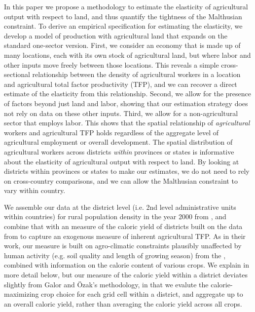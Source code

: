 \documentclass[11pt]{article}
\begin{document}
In this paper we propose a methodology to estimate the elasticity of agricultural output with respect to land, and thus quantify the tightness of the Malthusian constraint. To derive an empirical specification for estimating the elasticity, we develop a model of production with agricultural land that expands on the standard one-sector version. First, we consider an economy that is made up of many locations, each with its own stock of agricultural land, but where labor and other inputs move freely between those locations. This reveals a simple cross-sectional relationship between the density of agricultural workers in a location and agricultural total factor productivity (TFP), and we can recover a direct estimate of the elasticity from this relationship. Second, we allow for the presence of factors beyond just land and labor, showing that our estimation strategy does not rely on data on these other inputs. Third, we allow for a non-agricultural sector that employs labor. This shows that the spatial relationship of \textit{agricultural} workers and agricultural TFP holds regardless of the aggregate level of agricultural employment or overall development. The spatial distribution of agricultural workers across districts \textit{within} provinces or states is informative about the elasticity of agricultural output with respect to land. By looking at districts within provinces or states to make our estimates, we do not need to rely on cross-country comparisons, and we can allow the Malthusian constraint to vary within country.

We assemble our data at the district level (i.e. 2nd level administrative units within countries) for rural population density in the year 2000 from \citet{hyde31}, and combine that with an measure of the caloric yield of districts built on the data from \citet{galorozak2016} to capture an exogenous measure of inherent agricultural TFP. As in their work, our measure is built on agro-climatic constraints plausibly unaffected by human activity (e.g. soil quality and length of growing season) from the \citet{gaez}, combined with information on the calorie content of various crops. We explain in more detail below, but our measure of the caloric yield within a district deviates slightly from Galor and {\"O}zak's methodology, in that we evalute the calorie-maximizing crop choice for each grid cell within a district, and aggregate up to an overall caloric yield, rather than averaging the caloric yield across all crops.
\end{document}
